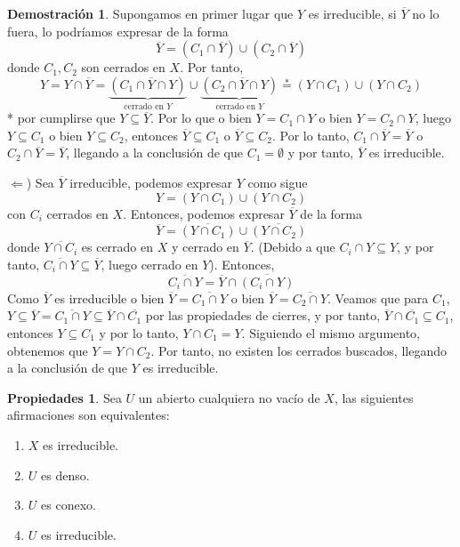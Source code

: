 \documentclass[12pt,twoside]{report}
\theoremstyle{azul}
\theoremstyle{azul2}
\theoremstyle{plain}
\theoremstyle{definition}
\newtheorem*{propi}{Propiedades}
\newtheorem*{dem}{Demostración}
\theoremstyle{remark}
\begin{document}
        \begin{dem} \:
        
        Supongamos en primer lugar que $Y$ es irreducible, si $\overline{Y}$ no lo fuera, lo podríamos expresar de la forma
        $$\overline{Y} = (C_1 \cap \overline{Y}) \cup (C_2 \cap \overline{Y})$$
        donde $C_1, C_2$ son cerrados en $X$. Por tanto, 
        $$Y = Y \cap \overline{Y} = \underbrace{(C_1 \cap \overline{Y} \cap Y)}_{\text{cerrado en }Y} \cup \underbrace{(C_2 \cap \overline{Y} \cap Y)}_{\text{cerrado en }Y}\overset{*}{=}(Y \cap C_1) \cup (Y \cap C_2)$$
        * por cumplirse que $Y \subseteq \overline{Y}$.
        Por lo que o bien $Y=C_1 \cap Y $ o bien $Y=C_2 \cap Y$, luego $Y \subseteq C_1$ o bien $Y \subseteq C_2$, entonces $\overline{Y} \subseteq C_1$ o $\overline{Y} \subseteq C_2$. Por lo tanto, $C_1 \cap \overline{Y} = \overline{Y}$ o $C_2 \cap \overline{Y} = \overline{Y}$, llegando a la conclusión de que $C_1=\emptyset$ y por tanto, $\overline{Y}$ es irreducible. 
        
        $\Leftarrow$) Sea $\overline{Y}$ irreducible, podemos expresar $Y$ como sigue
        $$Y = (Y \cap C_1) \cup (Y \cap C_2)$$
        con $C_i$ cerrados en $X$. Entonces, podemos expresar $\overline{Y}$ de la forma
        $$\overline{Y}=\overline{(Y \cap C_1)} \cup \overline{(Y \cap C_2)} $$
        donde $\overline{Y \cap C_i}$ es cerrado en $X$ y cerrado en $\overline{Y}$. (Debido a que $C_i \cap Y \subseteq Y$, y por tanto, $\overline{C_i \cap Y} \subseteq \overline{Y}$, luego cerrado en $Y$). Entonces,
        $$\overline{C_i \cap Y} = \overline{Y} \cap \overline{(C_i \cap Y)}$$
        Como $\overline{Y}$ es irreducible o bien $\overline{Y}=\overline{C_1 \cap Y}$ o bien $\overline{Y}=\overline{C_2 \cap Y}$. Veamos que para $C_1$, $Y \subseteq \overline{Y} = \overline{C_1 \cap Y} \subseteq \overline{Y} \cap \overline{C_1}$ por las propiedades de cierres, y por tanto, $\overline{Y} \cap \overline{C_1} \subseteq C_1$, entonces $Y \subseteq C_1$ y por lo tanto, $Y \cap C_1 = Y$. Siguiendo el mismo argumento, obtenemos que $Y=Y\cap C_2$. Por tanto, no existen los cerrados buscados, llegando a la conclusión de que $Y$ es irreducible.
        \end{dem}
\begin{propi} Sea $U$ un abierto cualquiera no vacío de $X$, las siguientes afirmaciones son equivalentes: 
\begin{enumerate}[1)]
    \item $X$ es irreducible.
    \item $U$ es denso.
    \item $U$ es conexo.
    \item $U$ es irreducible.
\end{enumerate}
\end{propi}
\end{document}
